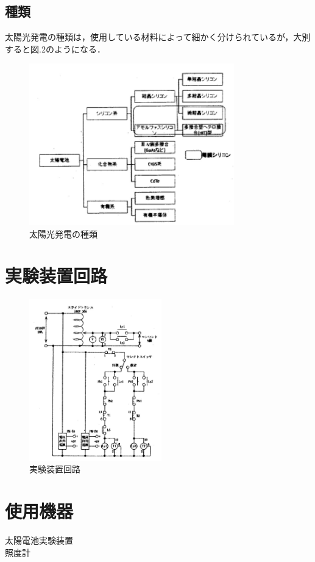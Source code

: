 \subsection{種類}
太陽光発電の種類は，使用している材料によって細かく分けられているが，大別すると図.2のようになる．\\
\begin{figure}[H]
  \centering
  \includegraphics[height=7cm]{./fig/fig02.png}
  \caption{太陽光発電の種類}
\end{figure}

\section{実験装置回路}
\begin{figure}[H]
  \centering
  \includegraphics[height=7cm]{./fig/fig03.png}
  \caption{実験装置回路}
\end{figure}


\section{使用機器}
太陽電池実験装置\\
照度計\\

